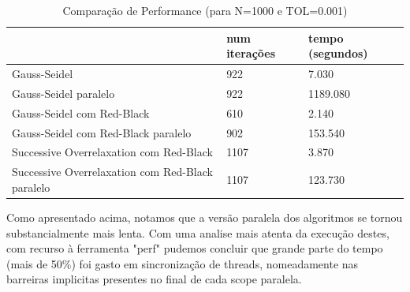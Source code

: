 \documentclass[a4paper]{report}
\begin{document}
\begin{table}[h]
\centering
\begin{tabular}{|l|l|l|}
\hline
                                                 & num iterações & tempo (segundos) \\ \hline
Gauss-Seidel                                     & 922           & 7.030            \\ \hline
Gauss-Seidel paralelo                            & 922           & 1189.080         \\ \hline
Gauss-Seidel com Red-Black                       & 610           & 2.140                 \\ \hline
Gauss-Seidel com Red-Black paralelo              & 902           & 153.540                 \\ \hline
Successive Overrelaxation com Red-Black          & 1107          & 3.870            \\ \hline
Successive Overrelaxation com Red-Black paralelo & 1107          & 123.730          \\ \hline
\end{tabular}
\caption{Comparação de Performance (para N=1000 e TOL=0.001)}
\label{tab:tempo}
\end{table}

\pagebreak
Como apresentado acima, notamos que a versão paralela dos algoritmos se tornou
substancialmente mais lenta. Com uma analise mais atenta da execução destes, com
recurso à ferramenta "perf" pudemos concluir que grande parte do tempo (mais de 50\%) 
foi gasto em sincronização de threads, nomeadamente nas barreiras implicitas presentes 
no final de cada scope paralela.
\end{document}
